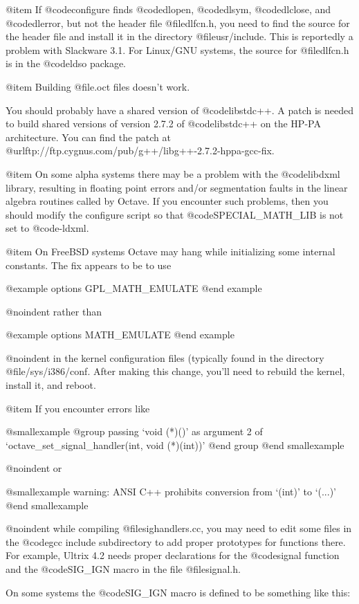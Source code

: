 @item
If @code{configure} finds @code{dlopen}, @code{dlsym}, @code{dlclose},
and @code{dlerror}, but not the header file @file{dlfcn.h}, you need to
find the source for the header file and install it in the directory
@file{usr/include}.  This is reportedly a problem with Slackware 3.1.
For Linux/GNU systems, the source for @file{dlfcn.h} is in the
@code{ldso} package.

@item
Building @file{.oct} files doesn't work.

You should probably have a shared version of @code{libstdc++}.  A patch
is needed to build shared versions of version 2.7.2 of @code{libstdc++}
on the HP-PA architecture.  You can find the patch at
@url{ftp://ftp.cygnus.com/pub/g++/libg++-2.7.2-hppa-gcc-fix}.

@item
On some alpha systems there may be a problem with the @code{libdxml}
library, resulting in floating point errors and/or segmentation faults in
the linear algebra routines called by Octave.  If you encounter such
problems, then you should modify the configure script so that
@code{SPECIAL_MATH_LIB} is not set to @code{-ldxml}.

@item
On FreeBSD systems Octave may hang while initializing some internal
constants.  The fix appears to be to use

@example
options      GPL_MATH_EMULATE
@end example

@noindent
rather than 

@example
options      MATH_EMULATE 
@end example

@noindent
in the kernel configuration files (typically found in the directory
@file{/sys/i386/conf}.  After making this change, you'll need to rebuild
the kernel, install it, and reboot.

@item
If you encounter errors like

@smallexample
@group
passing `void (*)()' as argument 2 of
  `octave_set_signal_handler(int, void (*)(int))'
@end group
@end smallexample

@noindent
or

@smallexample
warning: ANSI C++ prohibits conversion from `(int)' to `(...)'
@end smallexample

@noindent
while compiling @file{sighandlers.cc}, you may need to edit some files
in the @code{gcc} include subdirectory to add proper prototypes for functions
there.  For example, Ultrix 4.2 needs proper declarations for the
@code{signal} function and the @code{SIG_IGN} macro in the file
@file{signal.h}.

On some systems the @code{SIG_IGN} macro is defined to be something like
this:

